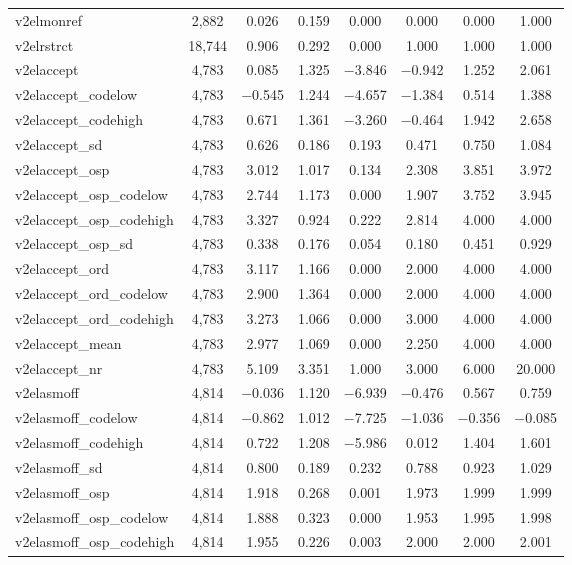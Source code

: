 \begin{table}[!htbp]
\begin{tabular}{@{\extracolsep{5pt}}lccccccc}
v2elmonref & 2,882 & 0.026 & 0.159 & 0.000 & 0.000 & 0.000 & 1.000 \\ 
v2elrstrct & 18,744 & 0.906 & 0.292 & 0.000 & 1.000 & 1.000 & 1.000 \\ 
v2elaccept & 4,783 & 0.085 & 1.325 & $-$3.846 & $-$0.942 & 1.252 & 2.061 \\ 
v2elaccept\_codelow & 4,783 & $-$0.545 & 1.244 & $-$4.657 & $-$1.384 & 0.514 & 1.388 \\ 
v2elaccept\_codehigh & 4,783 & 0.671 & 1.361 & $-$3.260 & $-$0.464 & 1.942 & 2.658 \\ 
v2elaccept\_sd & 4,783 & 0.626 & 0.186 & 0.193 & 0.471 & 0.750 & 1.084 \\ 
v2elaccept\_osp & 4,783 & 3.012 & 1.017 & 0.134 & 2.308 & 3.851 & 3.972 \\ 
v2elaccept\_osp\_codelow & 4,783 & 2.744 & 1.173 & 0.000 & 1.907 & 3.752 & 3.945 \\ 
v2elaccept\_osp\_codehigh & 4,783 & 3.327 & 0.924 & 0.222 & 2.814 & 4.000 & 4.000 \\ 
v2elaccept\_osp\_sd & 4,783 & 0.338 & 0.176 & 0.054 & 0.180 & 0.451 & 0.929 \\ 
v2elaccept\_ord & 4,783 & 3.117 & 1.166 & 0.000 & 2.000 & 4.000 & 4.000 \\ 
v2elaccept\_ord\_codelow & 4,783 & 2.900 & 1.364 & 0.000 & 2.000 & 4.000 & 4.000 \\ 
v2elaccept\_ord\_codehigh & 4,783 & 3.273 & 1.066 & 0.000 & 3.000 & 4.000 & 4.000 \\ 
v2elaccept\_mean & 4,783 & 2.977 & 1.069 & 0.000 & 2.250 & 4.000 & 4.000 \\ 
v2elaccept\_nr & 4,783 & 5.109 & 3.351 & 1.000 & 3.000 & 6.000 & 20.000 \\ 
v2elasmoff & 4,814 & $-$0.036 & 1.120 & $-$6.939 & $-$0.476 & 0.567 & 0.759 \\ 
v2elasmoff\_codelow & 4,814 & $-$0.862 & 1.012 & $-$7.725 & $-$1.036 & $-$0.356 & $-$0.085 \\ 
v2elasmoff\_codehigh & 4,814 & 0.722 & 1.208 & $-$5.986 & 0.012 & 1.404 & 1.601 \\ 
v2elasmoff\_sd & 4,814 & 0.800 & 0.189 & 0.232 & 0.788 & 0.923 & 1.029 \\ 
v2elasmoff\_osp & 4,814 & 1.918 & 0.268 & 0.001 & 1.973 & 1.999 & 1.999 \\ 
v2elasmoff\_osp\_codelow & 4,814 & 1.888 & 0.323 & 0.000 & 1.953 & 1.995 & 1.998 \\ 
v2elasmoff\_osp\_codehigh & 4,814 & 1.955 & 0.226 & 0.003 & 2.000 & 2.000 & 2.001 \\ 

\end{tabular}
\end{table}
